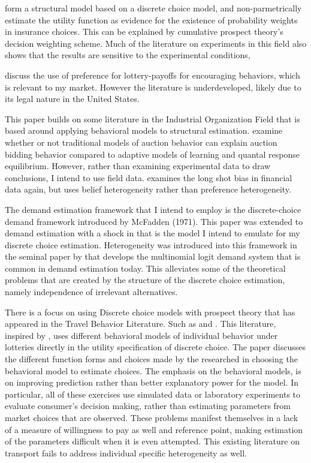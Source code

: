 \documentclass[12pt]{paper}
\begin{document}
\cite*{Barseghyan2012} form a structural model based on a discrete
choice model, and non-parmetrically estimate the utility function as
evidence for the existence of probability weights in insurance
choices. This can be explained by cumulative prospect theory's
decision weighting scheme. Much of the literature on experiments in
this field also shows that the results are sensitive to the
experimental conditions, \cite*{PlottZeiler}

\cite{LitReview} discuss the use of preference for lottery-payoffs for
encouraging behaviors, which is relevant to my market. However the
literature is underdeveloped, likely due to its legal nature in the
United States.

This paper builds on some literature in the Industrial Organization
Field that is based around applying behavioral models to structural
estimation. \cite*{BajariHortacsu2003} examine whether or not traditional
models of auction behavior can explain auction bidding behavior
compared to adaptive models of learning and quantal response
equilibrium. However, rather than examining experimental data to draw
conclusions, I intend to use field data. \cite{Gandhi2014} examines
the long shot bias in financial data again, but uses belief
heterogeneity rather than preference heterogeneity. 

The demand estimation framework that I intend to employ is the
discrete-choice demand framework introduced by McFadden (1971). This
paper was extended to demand estimation with a shock in \cite{Berry1994}
that is the model I intend to emulate for my discrete choice
estimation. Heterogeneity was introduced into this framework in the
seminal paper by \cite*{BLP} that develops the multinomial logit
demand system that is common in demand estimation today. This
alleviates some of the theoretical problems that are created by the
structure of the discrete choice estimation, namely independence of
irrelevant alternatives. 

There is a focus on using Discrete choice models with prospect theory
that has appeared in the Travel Behavior Literature. Such as
\cite{LiHensher2011} and \cite*{dePalma2007}. This literature,
inspired by \cite*{dePalmaEtAl}, uses different behavioral models of
individual behavior under lotteries directly in the utility
specification of discrete choice. The paper discusses the different
function forms and choices made by the researched in choosing the
behavioral model to estimate choices.  The emphasis on the behavioral
models, is on improving prediction rather than better explanatory
power for the model. In particular, all of these exercises use
simulated data or laboratory experiments to evaluate consumer's
decision making, rather than estimating parameters from market choices
that are observed. These problems manifest themselves in a lack of a
measure of willingness to pay as well and reference point, making
estimation of the parameters difficult when it is even attempted. This
existing literature on transport fails to address individual specific
heterogeneity as well.
\end{document}
